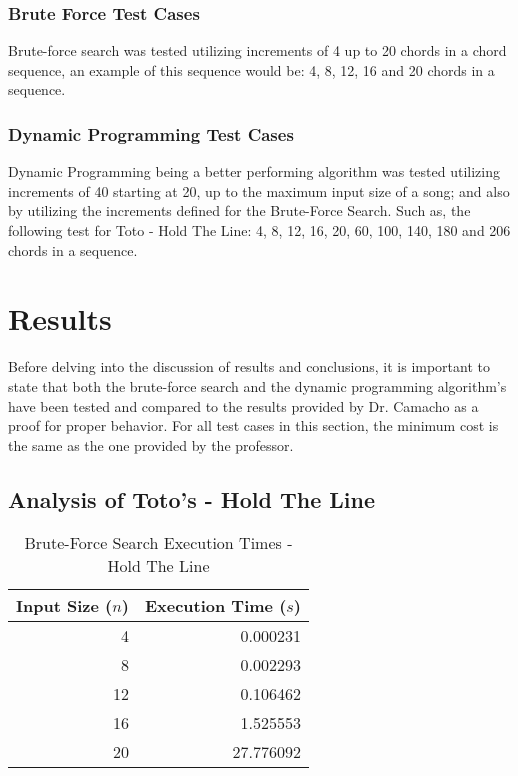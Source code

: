 \documentclass[conference]{IEEEtran}
\begin{document}
\subsubsection{Brute Force Test Cases}
Brute-force search was tested utilizing increments of 4 up to 20 chords in a chord sequence, an example of this sequence would be: 4, 8, 12, 16 and 20 chords in a sequence.  

\subsubsection{Dynamic Programming Test Cases}
Dynamic Programming being a better performing algorithm was tested utilizing increments of 40 starting at 20, up to the maximum input size of a song; and also by utilizing the increments defined for the Brute-Force Search. Such as, the following test for Toto - Hold The Line: 4, 8, 12, 16, 20, 60, 100, 140, 180 and 206 chords in a sequence.

\section{Results}
Before delving into the discussion of results and conclusions, it is important to state that both the brute-force search and the dynamic programming algorithm's have been tested and compared to the results provided by Dr. Camacho as a proof for proper behavior. For all test cases in this section, the minimum cost is the same as the one provided by the professor. 

\subsection{Analysis of Toto's - Hold The Line}
\begin{table}[H]
    \centering 
    \caption{Brute-Force Search Execution Times - Hold The Line}
    \renewcommand{\arraystretch}{1.2} %
    \setlength{\tabcolsep}{3pt} %
    \begin{tabular}{r r}
        \toprule
        \textbf{Input Size ($n$)} & \textbf{Execution Time ($s$)} \\
        \midrule 
        4 & 0.000231 \\
        8 & 0.002293 \\
        12 & 0.106462 \\
        16 & 1.525553 \\ 
        20 & 27.776092 \\
        \bottomrule
    \end{tabular}
\end{table}
\end{document}
